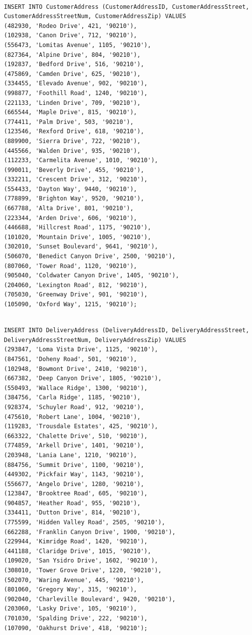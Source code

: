 \documentclass[11pt]{article}
\begin{document}
\begin{verbatim}

INSERT INTO CustomerAddress (CustomerAddressID, CustomerAddressStreet, CustomerAddressStreetNum, CustomerAddressZip) VALUES
(482930, 'Rodeo Drive', 421, '90210'),
(102938, 'Canon Drive', 712, '90210'),
(556473, 'Lomitas Avenue', 1105, '90210'),
(827364, 'Alpine Drive', 804, '90210'),
(192837, 'Bedford Drive', 516, '90210'),
(475869, 'Camden Drive', 625, '90210'),
(334455, 'Elevado Avenue', 902, '90210'),
(998877, 'Foothill Road', 1240, '90210'),
(221133, 'Linden Drive', 709, '90210'),
(665544, 'Maple Drive', 815, '90210'),
(774411, 'Palm Drive', 503, '90210'),
(123546, 'Rexford Drive', 618, '90210'),
(889900, 'Sierra Drive', 722, '90210'),
(445566, 'Walden Drive', 935, '90210'),
(112233, 'Carmelita Avenue', 1010, '90210'),
(990011, 'Beverly Drive', 455, '90210'),
(332211, 'Crescent Drive', 312, '90210'),
(554433, 'Dayton Way', 9440, '90210'),
(778899, 'Brighton Way', 9520, '90210'),
(667788, 'Alta Drive', 801, '90210'),
(223344, 'Arden Drive', 606, '90210'),
(446688, 'Hillcrest Road', 1175, '90210'),
(101020, 'Mountain Drive', 1005, '90210'),
(302010, 'Sunset Boulevard', 9641, '90210'),
(506070, 'Benedict Canyon Drive', 2500, '90210'),
(807060, 'Tower Road', 1120, '90210'),
(905040, 'Coldwater Canyon Drive', 1405, '90210'),
(204060, 'Lexington Road', 812, '90210'),
(705030, 'Greenway Drive', 901, '90210'),
(105090, 'Oxford Way', 1215, '90210');
\end{verbatim}
\begin{verbatim}

INSERT INTO DeliveryAddress (DeliveryAddressID, DeliveryAddressStreet, DeliveryAddressStreetNum, DeliveryAddressZip) VALUES
(293847, 'Loma Vista Drive', 1125, '90210'),
(847561, 'Doheny Road', 501, '90210'),
(102948, 'Bowmont Drive', 2410, '90210'),
(667382, 'Deep Canyon Drive', 1805, '90210'),
(550493, 'Wallace Ridge', 1300, '90210'),
(384756, 'Carla Ridge', 1185, '90210'),
(928374, 'Schuyler Road', 912, '90210'),
(475610, 'Robert Lane', 1004, '90210'),
(119283, 'Trousdale Estates', 425, '90210'),
(663322, 'Chalette Drive', 510, '90210'),
(774859, 'Arkell Drive', 1401, '90210'),
(203948, 'Lania Lane', 1210, '90210'),
(884756, 'Summit Drive', 1100, '90210'),
(449302, 'Pickfair Way', 1143, '90210'),
(556677, 'Angelo Drive', 1280, '90210'),
(123847, 'Brooktree Road', 605, '90210'),
(904857, 'Heather Road', 955, '90210'),
(334411, 'Dutton Drive', 814, '90210'),
(775599, 'Hidden Valley Road', 2505, '90210'),
(662288, 'Franklin Canyon Drive', 1900, '90210'),
(229944, 'Kimridge Road', 1420, '90210'),
(441188, 'Claridge Drive', 1015, '90210'),
(109020, 'San Ysidro Drive', 1602, '90210'),
(308010, 'Tower Grove Drive', 1220, '90210'),
(502070, 'Waring Avenue', 445, '90210'),
(801060, 'Gregory Way', 315, '90210'),
(902040, 'Charleville Boulevard', 9420, '90210'),
(203060, 'Lasky Drive', 105, '90210'),
(701030, 'Spalding Drive', 222, '90210'),
(107090, 'Oakhurst Drive', 418, '90210');
\end{verbatim}
\end{document}
